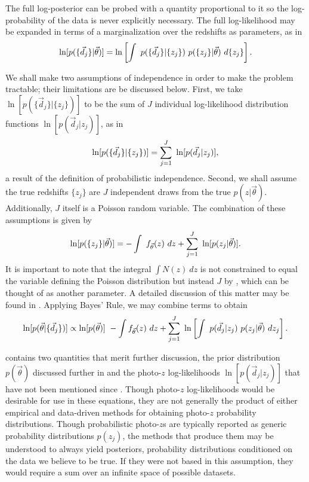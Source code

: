 The full log-posterior can be probed with a quantity proportional to it so the log-probability of the data is never explicitly necessary.  
The full log-likelihood may be expanded in terms of a marginalization over the redshifts as parameters, as in 
\begin{equation}
\eqlabel{eq:marginalize}
\ln[p(\{\vec{d}_{j}\}|\vec{\theta})] = \ln\left[\int\ p(\{\vec{d}_{j}\}|\{z_{j}\})\ p(\{z_{j}\}|\vec{\theta})\ d\{z_{j}\}\right].
\end{equation}

We shall make two assumptions of independence in order to make the problem tractable; their limitations are be discussed below.  
First, we take $\ln[p(\{\vec{d}_{j}\}|\{z_{j}\})]$ to be the sum of $J$ individual log-likelihood distribution functions $\ln[p(\vec{d}_{j}|z_{j})]$, as in 
\begin{equation}
\eqlabel{eq:indiedat}
\ln[p(\{\vec{d}_{j}\}|\{z_{j}\})] = \sum_{j=1}^{J}\ \ln[p(\vec{d}_{j}|z_{j})],
\end{equation}
a result of the definition of probabilistic independence.  
Second, we shall assume the true redshifts $\{z_{j}\}$ are $J$ independent draws from the true $p(z|\vec{\theta})$.  
Additionally, $J$ itself is a Poisson random variable.  
The combination of these assumptions is given by 
\begin{equation}
\eqlabel{eq:indie}
\ln[p(\{z_{j}\}|\vec{\theta})] = -\int\ f_{\vec{\theta}}(z)\ dz + \sum_{j=1}^{J}\ \ln[p(z_{j}|\vec{\theta})].
\end{equation}
It is important to note that the integral $\int N(z)\ dz$ is not constrained to equal the variable defining the Poisson distribution but instead $J$ by , which can be thought of as another parameter.  
A detailed discussion of this matter may be found in \citet{Foreman-Mackey2014}.  
Applying Bayes' Rule, we may combine terms to obtain 
\begin{equation}
\eqlabel{eq:posterior}
\ln[p(\vec{\theta}|\{\vec{d}_{j}\})] \propto \ln[p(\vec{\theta})]\ -\int f_{\vec{\theta}}(z)\ dz + \sum_{j=1}^{J}\ \ln\left[\int\ p(\vec{d}_{j}|z_{j})\ p(z_{j}|\vec{\theta})\ dz_{j}\right].
\end{equation}

 contains two quantities that merit further discussion, the prior distribution $p(\vec{\theta})$ discussed further in  and the photo-$z$ log-likelihoods $\ln[p(\vec{d}_{j}|z_{j})]$ that have not been mentioned since .  
Though photo-$z$ log-likelihoods would be desirable for use in these equations, they are not generally the product of either empirical and data-driven methods for obtaining photo-$z$ probability distributions.  
Though probabilistic photo-$z$s are typically reported as generic probability distributions $p(z_{j})$, the methods that produce them may be understood to always yield posteriors, probability distributions conditioned on the data we believe to be true.  
If they were not based in this assumption, they would require a sum over an infinite space of possible datasets.

